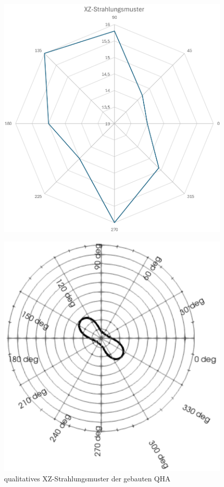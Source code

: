 \begin{figure}[H]
\begin{minipage}[b]{.4\linewidth} %
	\includegraphics[width=\linewidth]{../ref/XZmeasuredqfh.png}
	\label{fig:XZradiationqfh}
	\caption{qualitatives XZ-Strahlungsmuster der gebauten QHA}
\end{minipage}
\hspace{.1\linewidth}%
\begin{minipage}[b]{.4\linewidth} %
	\includegraphics[width=\linewidth]{../ref/XZsimulationqfh.png}

\end{minipage}
\end{figure}
